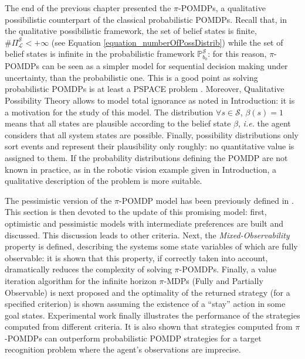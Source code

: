 The end of the previous chapter presented the $\pi$-POMDPs, 
a qualitative possibilistic counterpart of the classical probabilistic POMDPs.
Recall that, in the qualitative possibilistic framework, the set of belief states is finite, 
$\# \Pi^{\mathcal{S}}_{\mathcal{L}} < +\infty$ (see Equation \ref{equation_numberOfPossDistrib})
while the set of belief states is infinite in the probabilistic framework $\mathbb{P}^{\mathcal{S}}_{b_0}$:
for this reason, $\pi$-POMDPs can be seen as a simpler model 
for sequential decision making under uncertainty,
than the probabilistic one. This is a good point as solving probabilistic POMDPs 
is at least a PSPACE problem \cite{Papadimitriou:1987,Madani:1999:UPP:315149.315395}.
Moreover, Qualitative Possibility Theory allows to model total ignorance
as noted in Introduction: it is a motivation for the study of this model.
The distribution $\forall s \in \mathcal{S}$, $\beta(s) = 1$ means that all
states are plausible according to the belief state $\beta$, \textit{i.e.} 
the agent considers that all system states are possible. 
Finally, possibility distributions only sort events
and represent their plausibility only roughly:
no quantitative value is assigned to them.
If the probability distributions defining the POMDP are not known in practice,
as in the robotic vision example given in Introduction,
a qualitative description of the problem is more suitable.

The pessimistic version of the $\pi$-POMDP model 
has been previously defined in \cite{Sabbadin:1999:pipomdp}.
This section is then devoted to the update of this promising model:
first, optimistic and pessimistic models 
with intermediate preferences are built and discussed.
This discussion leads to other criteria.
Next, the \textit{Mixed-Observability} property \cite{OngShaoHsuWee-IJRR10,AraThoBufCha-ICTAI10} 
is defined, describing the systems some state variables 
of which are fully observable:
it is shown that this property, if correctly taken into account,
dramatically reduces the complexity of solving $\pi$-POMDPs.
Finally, a value iteration algorithm for the infinite horizon 
$\pi$-MDPs (Fully and Partially Observable) 
is next proposed and the optimality of the returned strategy (for a specified criterion) 
is shown assuming the existence of a ``stay'' action in some goal states.
Experimental work finally 
illustrates the performance of the strategies 
computed from different criteria. 
It is also shown that strategies computed 
from $\pi$-POMDPs can
outperform probabilistic POMDP strategies 
for a target recognition problem 
where the agent's observations are imprecise. 

